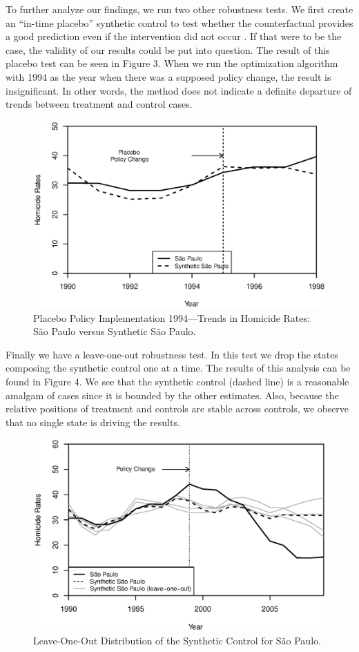 \documentclass[a4paper,11pt]{article}
\begin{document}
To further analyze our findings, we run two other robustness tests. We first create an ``in-time placebo'' synthetic control to test whether the counterfactual provides a good prediction even if the intervention did not occur \citep{abadie2014}. If that were to be the case, the validity of our results could be put into question. The result of this placebo test can be seen in Figure 3. When we run the optimization algorithm with 1994 as the year when there was a supposed policy change, the result is insignificant. In other words, the method does not indicate a definite departure of trends between treatment and control cases. 

\begin{figure}[htp!]
\begin{center}
\centerline{\includegraphics[width=.6\textwidth]{placebo.eps}}
\caption{Placebo Policy Implementation 1994---Trends in Homicide Rates: S\~{a}o Paulo versus Synthetic S\~{a}o Paulo.}\label{placebo}
\end{center}
\end{figure}

\newpage

Finally we have a leave-one-out robustness test. In this test we drop the states composing the synthetic control one at a time. The results of this analysis can be found in Figure 4. We see that the synthetic control (dashed line) is a reasonable amalgam of cases since it is bounded by the other estimates. Also, because the relative positions of treatment and controls are stable across controls, we observe that no single state is driving the results.

\begin{figure}[htp!]
\begin{center}
\centerline{\includegraphics[width=.6\textwidth]{leave-one-out.eps}}
\caption{Leave-One-Out Distribution of the Synthetic Control for S\~{a}o Paulo.}\label{leave}
\end{center}
\end{figure}
\end{document}
